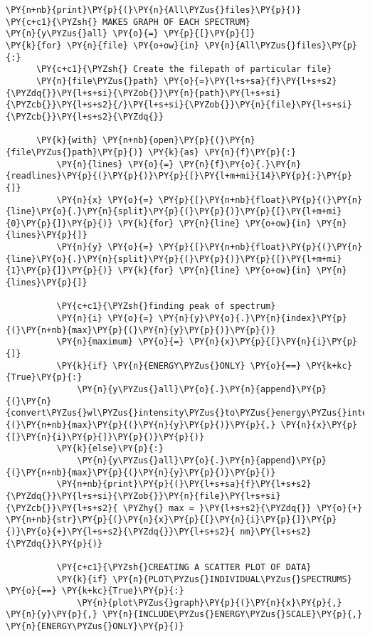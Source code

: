 \begin{tcolorbox}[breakable, size=fbox, boxrule=1pt, pad at break*=1mm,colback=cellbackground, colframe=cellborder]
\begin{Verbatim}[commandchars=\\\{\}]
\PY{n+nb}{print}\PY{p}{(}\PY{n}{All\PYZus{}files}\PY{p}{)}
\PY{c+c1}{\PYZsh{} MAKES GRAPH OF EACH SPECTRUM}
\PY{n}{y\PYZus{}all} \PY{o}{=} \PY{p}{[}\PY{p}{]}
\PY{k}{for} \PY{n}{file} \PY{o+ow}{in} \PY{n}{All\PYZus{}files}\PY{p}{:}
      \PY{c+c1}{\PYZsh{} Create the filepath of particular file}
      \PY{n}{file\PYZus{}path} \PY{o}{=}\PY{l+s+sa}{f}\PY{l+s+s2}{\PYZdq{}}\PY{l+s+si}{\PYZob{}}\PY{n}{path}\PY{l+s+si}{\PYZcb{}}\PY{l+s+s2}{/}\PY{l+s+si}{\PYZob{}}\PY{n}{file}\PY{l+s+si}{\PYZcb{}}\PY{l+s+s2}{\PYZdq{}}
      
      \PY{k}{with} \PY{n+nb}{open}\PY{p}{(}\PY{n}{file\PYZus{}path}\PY{p}{)} \PY{k}{as} \PY{n}{f}\PY{p}{:}
          \PY{n}{lines} \PY{o}{=} \PY{n}{f}\PY{o}{.}\PY{n}{readlines}\PY{p}{(}\PY{p}{)}\PY{p}{[}\PY{l+m+mi}{14}\PY{p}{:}\PY{p}{]}
          \PY{n}{x} \PY{o}{=} \PY{p}{[}\PY{n+nb}{float}\PY{p}{(}\PY{n}{line}\PY{o}{.}\PY{n}{split}\PY{p}{(}\PY{p}{)}\PY{p}{[}\PY{l+m+mi}{0}\PY{p}{]}\PY{p}{)} \PY{k}{for} \PY{n}{line} \PY{o+ow}{in} \PY{n}{lines}\PY{p}{]}
          \PY{n}{y} \PY{o}{=} \PY{p}{[}\PY{n+nb}{float}\PY{p}{(}\PY{n}{line}\PY{o}{.}\PY{n}{split}\PY{p}{(}\PY{p}{)}\PY{p}{[}\PY{l+m+mi}{1}\PY{p}{]}\PY{p}{)} \PY{k}{for} \PY{n}{line} \PY{o+ow}{in} \PY{n}{lines}\PY{p}{]}
                 
          \PY{c+c1}{\PYZsh{}finding peak of spectrum}
          \PY{n}{i} \PY{o}{=} \PY{n}{y}\PY{o}{.}\PY{n}{index}\PY{p}{(}\PY{n+nb}{max}\PY{p}{(}\PY{n}{y}\PY{p}{)}\PY{p}{)}
          \PY{n}{maximum} \PY{o}{=} \PY{n}{x}\PY{p}{[}\PY{n}{i}\PY{p}{]}
          \PY{k}{if} \PY{n}{ENERGY\PYZus{}ONLY} \PY{o}{==} \PY{k+kc}{True}\PY{p}{:}
              \PY{n}{y\PYZus{}all}\PY{o}{.}\PY{n}{append}\PY{p}{(}\PY{n}{convert\PYZus{}wl\PYZus{}intensity\PYZus{}to\PYZus{}energy\PYZus{}intensity}\PY{p}{(}\PY{n+nb}{max}\PY{p}{(}\PY{n}{y}\PY{p}{)}\PY{p}{,} \PY{n}{x}\PY{p}{[}\PY{n}{i}\PY{p}{]}\PY{p}{)}\PY{p}{)}
          \PY{k}{else}\PY{p}{:}
              \PY{n}{y\PYZus{}all}\PY{o}{.}\PY{n}{append}\PY{p}{(}\PY{n+nb}{max}\PY{p}{(}\PY{n}{y}\PY{p}{)}\PY{p}{)}
          \PY{n+nb}{print}\PY{p}{(}\PY{l+s+sa}{f}\PY{l+s+s2}{\PYZdq{}}\PY{l+s+si}{\PYZob{}}\PY{n}{file}\PY{l+s+si}{\PYZcb{}}\PY{l+s+s2}{ \PYZhy{} max = }\PY{l+s+s2}{\PYZdq{}} \PY{o}{+} \PY{n+nb}{str}\PY{p}{(}\PY{n}{x}\PY{p}{[}\PY{n}{i}\PY{p}{]}\PY{p}{)}\PY{o}{+}\PY{l+s+s2}{\PYZdq{}}\PY{l+s+s2}{ nm}\PY{l+s+s2}{\PYZdq{}}\PY{p}{)}
          
          \PY{c+c1}{\PYZsh{}CREATING A SCATTER PLOT OF DATA}
          \PY{k}{if} \PY{n}{PLOT\PYZus{}INDIVIDUAL\PYZus{}SPECTRUMS} \PY{o}{==} \PY{k+kc}{True}\PY{p}{:}
              \PY{n}{plot\PYZus{}graph}\PY{p}{(}\PY{n}{x}\PY{p}{,} \PY{n}{y}\PY{p}{,} \PY{n}{INCLUDE\PYZus{}ENERGY\PYZus{}SCALE}\PY{p}{,} \PY{n}{ENERGY\PYZus{}ONLY}\PY{p}{)}


\end{Verbatim}
\end{tcolorbox}

